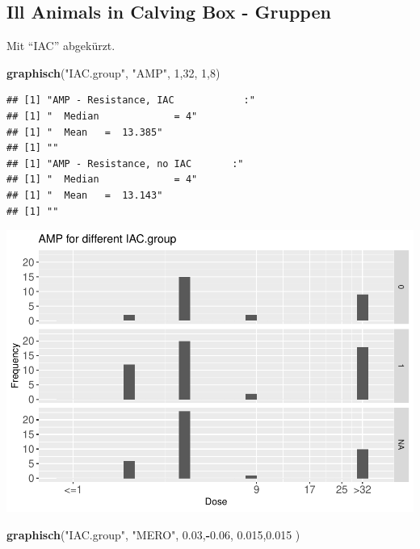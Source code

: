 \documentclass[
]{article}
\newenvironment{Shaded}{\begin{snugshade}}{\end{snugshade}}
\newcommand{\DecValTok}[1]{\textcolor[rgb]{0.00,0.00,0.81}{#1}}
\newcommand{\FloatTok}[1]{\textcolor[rgb]{0.00,0.00,0.81}{#1}}
\newcommand{\KeywordTok}[1]{\textcolor[rgb]{0.13,0.29,0.53}{\textbf{#1}}}
\newcommand{\NormalTok}[1]{#1}
\newcommand{\OperatorTok}[1]{\textcolor[rgb]{0.81,0.36,0.00}{\textbf{#1}}}
\newcommand{\StringTok}[1]{\textcolor[rgb]{0.31,0.60,0.02}{#1}}
\begin{document}
\hypertarget{ill-animals-in-calving-box---gruppen}{%
\subsection{Ill Animals in Calving Box -
Gruppen}\label{ill-animals-in-calving-box---gruppen}}

Mit ``IAC'' abgekürzt.

\begin{Shaded}
\begin{Highlighting}[]
  \KeywordTok{graphisch}\NormalTok{(}\StringTok{"IAC.group"}\NormalTok{, }\StringTok{"AMP"}\NormalTok{, }\DecValTok{1}\NormalTok{,}\DecValTok{32}\NormalTok{, }\DecValTok{1}\NormalTok{,}\DecValTok{8}\NormalTok{)  }
\end{Highlighting}
\end{Shaded}

\begin{verbatim}
## [1] "AMP - Resistance, IAC            :"
## [1] "  Median             = 4"
## [1] "  Mean   =  13.385"
## [1] ""
## [1] "AMP - Resistance, no IAC       :"
## [1] "  Median             = 4"
## [1] "  Mean   =  13.143"
## [1] ""
\end{verbatim}

\includegraphics{Verteilungen_files/figure-latex/unnamed-chunk-5-1.pdf}

\begin{Shaded}
\begin{Highlighting}[]
  \KeywordTok{graphisch}\NormalTok{(}\StringTok{"IAC.group"}\NormalTok{, }\StringTok{"MERO"}\NormalTok{, }\FloatTok{0.03}\NormalTok{,}\OperatorTok{-}\FloatTok{0.06}\NormalTok{,   }\FloatTok{0.015}\NormalTok{,}\FloatTok{0.015}\NormalTok{ )}
\end{Highlighting}
\end{Shaded}
\end{document}
